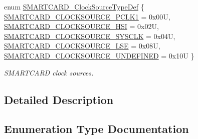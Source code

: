 \begin{DoxyCompactItemize}
enum \hyperlink{group___s_m_a_r_t_c_a_r_d___exported___types_ga4596aa4eba2308543a4e5d36d28ac126}{S\+M\+A\+R\+T\+C\+A\+R\+D\+\_\+\+Clock\+Source\+Type\+Def} \{ \newline
\hyperlink{group___s_m_a_r_t_c_a_r_d___exported___types_gga4596aa4eba2308543a4e5d36d28ac126a2cead1ebc916ef6e986cc2d50c8ceb02}{S\+M\+A\+R\+T\+C\+A\+R\+D\+\_\+\+C\+L\+O\+C\+K\+S\+O\+U\+R\+C\+E\+\_\+\+P\+C\+L\+K1} = 0x00U, 
\hyperlink{group___s_m_a_r_t_c_a_r_d___exported___types_gga4596aa4eba2308543a4e5d36d28ac126a2531e8e44d1f01704fa48e5c8015d773}{S\+M\+A\+R\+T\+C\+A\+R\+D\+\_\+\+C\+L\+O\+C\+K\+S\+O\+U\+R\+C\+E\+\_\+\+H\+SI} = 0x02U, 
\hyperlink{group___s_m_a_r_t_c_a_r_d___exported___types_gga4596aa4eba2308543a4e5d36d28ac126acdb3d8207c8bd91abe73b8f996c9229b}{S\+M\+A\+R\+T\+C\+A\+R\+D\+\_\+\+C\+L\+O\+C\+K\+S\+O\+U\+R\+C\+E\+\_\+\+S\+Y\+S\+C\+LK} = 0x04U, 
\hyperlink{group___s_m_a_r_t_c_a_r_d___exported___types_gga4596aa4eba2308543a4e5d36d28ac126aeb25e4041655c05324e8f21ae5d3146a}{S\+M\+A\+R\+T\+C\+A\+R\+D\+\_\+\+C\+L\+O\+C\+K\+S\+O\+U\+R\+C\+E\+\_\+\+L\+SE} = 0x08U, 
\newline
\hyperlink{group___s_m_a_r_t_c_a_r_d___exported___types_gga4596aa4eba2308543a4e5d36d28ac126a2346ee1279d1c3126660e6f9f653970a}{S\+M\+A\+R\+T\+C\+A\+R\+D\+\_\+\+C\+L\+O\+C\+K\+S\+O\+U\+R\+C\+E\+\_\+\+U\+N\+D\+E\+F\+I\+N\+ED} = 0x10U
 \}\begin{DoxyCompactList}\small\item\em S\+M\+A\+R\+T\+C\+A\+RD clock sources. \end{DoxyCompactList}
\end{DoxyCompactItemize}


\subsection{Detailed Description}


\subsection{Enumeration Type Documentation}
\mbox{\label{group___s_m_a_r_t_c_a_r_d___exported___types_ga79d6a3b95636861dcfd70913746e087e}} 
